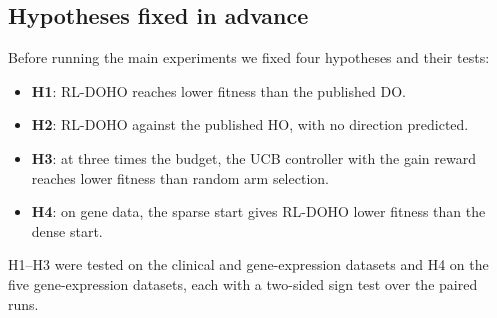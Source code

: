 \documentclass[journal]{IEEEtran}
\begin{document}
\subsection{Hypotheses fixed in advance}
Before running the main experiments we fixed four hypotheses and their tests:
\begin{itemize}
\item \textbf{H1}: RL-DOHO reaches lower fitness than the published DO.
\item \textbf{H2}: RL-DOHO against the published HO, with no direction predicted.
\item \textbf{H3}: at three times the budget, the UCB controller with the gain reward reaches lower fitness than random arm selection.
\item \textbf{H4}: on gene data, the sparse start gives RL-DOHO lower fitness than the dense start.
\end{itemize}
H1--H3 were tested on the clinical and gene-expression datasets and H4 on the five gene-expression datasets, each with a two-sided sign test over the paired runs.
\end{document}
